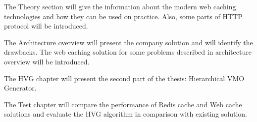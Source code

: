 The Theory section will give the information about the modern web caching technologies and how they can be used on practice. Also, some parts of HTTP protocol will be introduced.

The Architecture overview will present the company solution and will identify the drawbacks. The web caching solution for some problems described in architecture overview will be introduced.

The HVG chapter will present the second part of the thesis: Hierarchical VMO Generator.

The Test chapter will compare the performance of Redis cache and Web cache solutions and evaluate the HVG algorithm in comparison with existing solution.

\newpage
